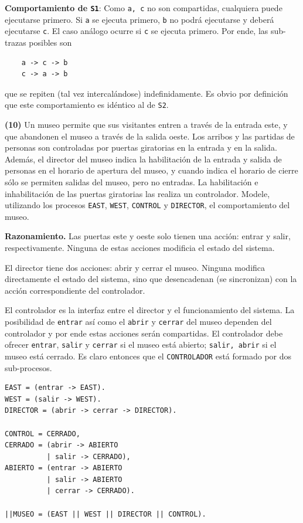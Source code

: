 \documentclass[a4paper, 12pt]{article}
\begin{document}
\textbf{Comportamiento de \texttt{S1}}: Como \texttt{a, c} no son compartidas,
cualquiera puede ejecutarse primero. Si \texttt{a} se ejecuta primero,
\texttt{b} no podrá ejecutarse y deberá ejecutarse \texttt{c}. El caso análogo
ocurre si \texttt{c} se ejecuta primero. Por ende, las sub-trazas posibles son 

\begin{verbatim}
    a -> c -> b 
    c -> a -> b
\end{verbatim}

que se repiten (tal vez intercalándose) indefinidamente. Es obvio por
definición que este comportamiento es idéntico al de \texttt{S2}.


\pagebreak 

\begin{myframe}
\textbf{(10)} Un museo permite que sus visitantes entren a través de la entrada
este, y que abandonen el museo a través de la salida oeste. Los arribos y las
partidas de personas son controladas por puertas giratorias en la entrada y en
la salida. Además, el director del museo indica la habilitación de la entrada y
salida de personas en el horario de apertura del museo, y cuando indica el
horario de cierre sólo se permiten salidas del museo, pero no entradas. La
habilitación e inhabilitación de las puertas giratorias las realiza un
controlador. Modele, utilizando los procesos \texttt{EAST}, \texttt{WEST},
\texttt{CONTROL} y \texttt{DIRECTOR}, el comportamiento del museo.
\end{myframe}

\textbf{Razonamiento.} Las puertas este y oeste solo tienen una acción: entrar y
salir, respectivamente. Ninguna de estas acciones modificia el estado del
sistema.

El director tiene dos acciones: abrir y cerrar el museo. Ninguna modifica
directamente el estado del sistema, sino que desencadenan (se sincronizan) con
la acción correspondiente del controlador.

El controlador es la interfaz entre el director y el funcionamiento del sistema.
La posibilidad de \texttt{entrar} así como el \texttt{abrir} y \texttt{cerrar}
del museo dependen del controlador y por ende estas acciones serán compartidas.
El controlador debe ofrecer \texttt{entrar}, \texttt{salir} y \texttt{cerrar} si
el museo está abierto; \texttt{salir, abrir} si el museo está cerrado. Es claro
entonces que el \texttt{CONTROLADOR} está formado por dos sub-procesos.

\begin{verbatim}
EAST = (entrar -> EAST).
WEST = (salir -> WEST).
DIRECTOR = (abrir -> cerrar -> DIRECTOR).

CONTROL = CERRADO,
CERRADO = (abrir -> ABIERTO 
          | salir -> CERRADO),
ABIERTO = (entrar -> ABIERTO 
          | salir -> ABIERTO 
          | cerrar -> CERRADO).

||MUSEO = (EAST || WEST || DIRECTOR || CONTROL).
\end{verbatim}
\end{document}
